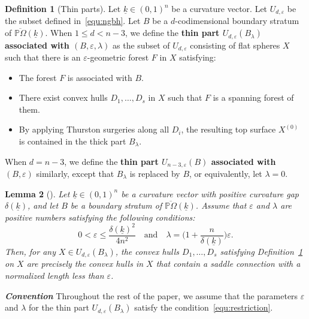 \documentclass{compositio}
\numberwithin{equation}{section}
\numberwithin{figure}{section}
\theoremstyle{definition}
\newtheorem{definition}{Definition}[section]
\theoremstyle{plain}
\newtheorem{lemma}[definition]{Lemma}
\begin{document}
{\begin{definition}[Thin parts]\label{def:thinparts}
    Let $\underline{k}\in(0,1)^n$ be a curvature vector. Let $U_{d,\varepsilon}$ be the subset defined in~\eqref{equ:ngbh}. Let $B$ be a $d$-codimensional boundary stratum of $\overline{\mathbb{P}\Omega}(\underline{k})$. When $1\leq d < n-3$, we define the \textbf{thin part $U_{d,\varepsilon}(B_{\lambda})$ associated with $(B,\varepsilon,\lambda)$} as the subset of $U_{d,\varepsilon}$ consisting of flat spheres $X$ such that there is an $\varepsilon$-geometric forest $F$ in $X$ satisfying:
    \begin{itemize}
        \item The forest $F$ is associated with $B$.
        \item There exist convex hulls $D_1,\ldots,D_s$ in $X$ such that $F$ is a spanning forest of them.
        \item By applying Thurston surgeries along all $D_i$, the resulting top surface $X^{(0)}$ is contained in the thick part $B_{\lambda}$.
    \end{itemize}
    When $d = n-3$, we define the \textbf{thin part $U_{n-3,\varepsilon}(B)$ associated with $(B,\varepsilon)$} similarly, except that $B_{\lambda}$ is replaced by $B$, or equivalently, let $\lambda = 0$.
\end{definition}

\begin{lemma}[{\cite[Proposition~5.6]{fu2024uniformlengthestimatestrajectories}}]\label{lem:epsilonconvexhulls}
Let $\underline{k}\in(0,1)^n$ be a curvature vector with positive curvature gap $\delta(\underline{k})$, and let $B$ be a boundary stratum of $\overline{\mathbb{P}\Omega}(\underline{k})$. Assume that $\varepsilon$ and $\lambda$ are positive numbers satisfying the following conditions:
\begin{equation}\label{equ:restriction}
    0 < \varepsilon \leq \frac{\delta(\underline{k})^2}{4n^2} 
    \quad \text{and} \quad 
    \lambda = \bigg(1 + \frac{n}{\delta(\underline{k})}\bigg)\varepsilon.
\end{equation}
Then, for any $X \in U_{d,\varepsilon}(B_{\lambda})$, the convex hulls $D_1, \ldots, D_s$ satisfying Definition~\ref{def:thinparts} on $X$ are precisely the convex hulls in $X$ that contain a saddle connection with a normalized length less than $\varepsilon$.
\end{lemma}


\noindent\textit{\textbf{Convention}} Throughout the rest of the paper, we assume that the parameters $\varepsilon$ and $\lambda$ for the thin part $U_{d,\varepsilon}(B_{\lambda})$ satisfy the condition~\eqref{equ:restriction}.\newline

}
\end{document}
